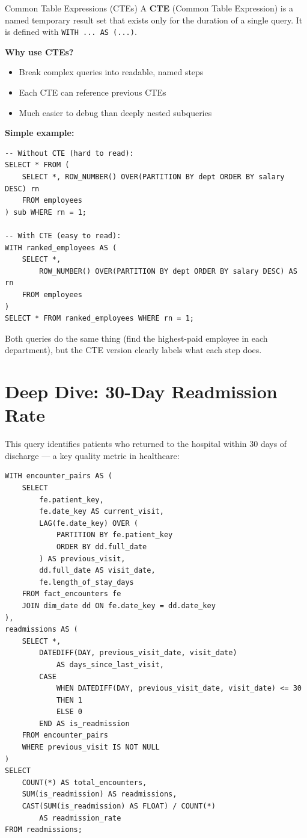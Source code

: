 \documentclass[12pt, a4paper, oneside]{report}
\begin{document}
\begin{conceptbox}{Common Table Expressions (CTEs)}
A \textbf{CTE} (Common Table Expression) is a named temporary result set that exists only for the duration of a single query. It is defined with \texttt{WITH ... AS (...)}.

\textbf{Why use CTEs?}
\begin{itemize}
    \item Break complex queries into readable, named steps
    \item Each CTE can reference previous CTEs
    \item Much easier to debug than deeply nested subqueries
\end{itemize}

\textbf{Simple example:}
\begin{lstlisting}[style=sqlstyle]
-- Without CTE (hard to read):
SELECT * FROM (
    SELECT *, ROW_NUMBER() OVER(PARTITION BY dept ORDER BY salary DESC) rn
    FROM employees
) sub WHERE rn = 1;

-- With CTE (easy to read):
WITH ranked_employees AS (
    SELECT *,
        ROW_NUMBER() OVER(PARTITION BY dept ORDER BY salary DESC) AS rn
    FROM employees
)
SELECT * FROM ranked_employees WHERE rn = 1;
\end{lstlisting}
Both queries do the same thing (find the highest-paid employee in each department), but the CTE version clearly labels what each step does.
\end{conceptbox}

\section{Deep Dive: 30-Day Readmission Rate}

This query identifies patients who returned to the hospital within 30 days of discharge --- a key quality metric in healthcare:

\begin{lstlisting}[style=sqlstyle, caption={Readmission rate query pattern}]
WITH encounter_pairs AS (
    SELECT
        fe.patient_key,
        fe.date_key AS current_visit,
        LAG(fe.date_key) OVER (
            PARTITION BY fe.patient_key
            ORDER BY dd.full_date
        ) AS previous_visit,
        dd.full_date AS visit_date,
        fe.length_of_stay_days
    FROM fact_encounters fe
    JOIN dim_date dd ON fe.date_key = dd.date_key
),
readmissions AS (
    SELECT *,
        DATEDIFF(DAY, previous_visit_date, visit_date)
            AS days_since_last_visit,
        CASE
            WHEN DATEDIFF(DAY, previous_visit_date, visit_date) <= 30
            THEN 1
            ELSE 0
        END AS is_readmission
    FROM encounter_pairs
    WHERE previous_visit IS NOT NULL
)
SELECT
    COUNT(*) AS total_encounters,
    SUM(is_readmission) AS readmissions,
    CAST(SUM(is_readmission) AS FLOAT) / COUNT(*)
        AS readmission_rate
FROM readmissions;
\end{lstlisting}
\end{document}
